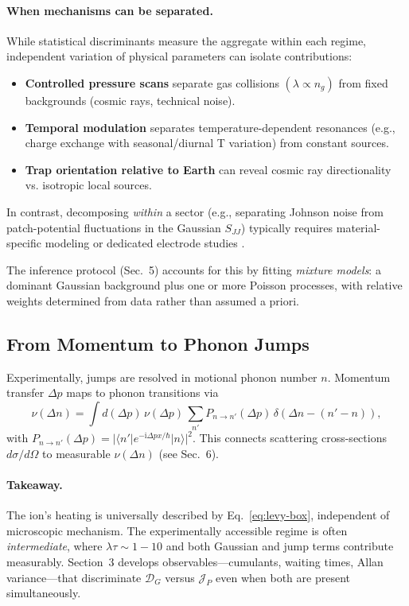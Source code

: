 \paragraph{When mechanisms can be separated.}
While statistical discriminants measure the aggregate within each regime, 
independent variation of physical parameters can isolate contributions:
\begin{itemize}
\item \textbf{Controlled pressure scans} separate gas collisions $(\lambda \propto n_g)$ from fixed backgrounds (cosmic rays, technical noise).
\item \textbf{Temporal modulation} separates temperature-dependent 
  resonances (e.g., charge exchange with seasonal/diurnal T variation) 
  from constant sources.
\item \textbf{Trap orientation relative to Earth} can reveal cosmic ray 
  directionality vs. isotropic local sources.
\end{itemize}
In contrast, decomposing \emph{within} a sector (e.g., separating Johnson 
noise from patch-potential fluctuations in the Gaussian $S_{JJ}$) typically 
requires material-specific modeling or dedicated electrode studies 
\cite{Brownnutt2015}.

The inference protocol (Sec.~5) accounts for this by fitting 
\emph{mixture models}: a dominant Gaussian background plus 
one or more Poisson processes, with relative weights 
determined from data rather than assumed a priori.

\subsection{From Momentum to Phonon Jumps}
Experimentally, jumps are resolved in motional phonon number $n$. 
Momentum transfer $\Delta p$ maps to phonon transitions via
\begin{equation}
\nu(\Delta n) = \int d(\Delta p)\,\nu(\Delta p)\,\sum_{n'} P_{n\to n'}(\Delta p)\, \delta(\Delta n-(n'-n)),
\end{equation}
with $P_{n\to n'}(\Delta p)=|\langle n'|e^{-\mathrm{i}\Delta p x/\hbar}|n\rangle|^2$. 
This connects scattering cross-sections $d\sigma/d\Omega$ to measurable $\nu(\Delta n)$ (see Sec.~6).

\paragraph{Takeaway.} 
The ion's heating is universally described by Eq.~\eqref{eq:levy-box}, independent of microscopic mechanism. 
The experimentally accessible regime is often \emph{intermediate}, where $\lambda \tau \sim 1{-}10$ and both Gaussian and jump terms contribute measurably. 
Section~3 develops observables—cumulants, waiting times, Allan variance—that discriminate $\mathcal{D}_G$ versus $\mathcal{J}_P$ even when both are present simultaneously.

